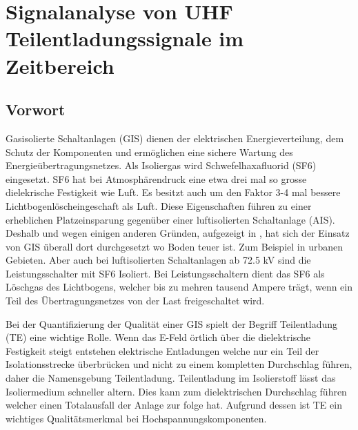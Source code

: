 %
%
%
\chapter{Signalanalyse von UHF Teilentladungssignale im Zeitbereich \label{chapter:gis}}
\begin{refsection}

\section{Vorwort}

Gasisolierte Schaltanlagen (GIS) dienen der elektrischen Energieverteilung, dem Schutz der Komponenten und ermöglichen eine sichere Wartung des Energieübertragungsnetzes.
Als Isoliergas wird Schwefelhaxafluorid (SF6) eingesetzt. SF6 hat bei Atmosphärendruck eine etwa drei mal so grosse dielekrische Festigkeit wie Luft. 
Es besitzt auch um den Faktor 3-4 mal bessere Lichtbogenlöscheingeschaft als Luft. 
Diese Eigenschaften führen zu einer erheblichen Platzeinsparung gegenüber einer luftisolierten Schaltanlage (AIS). \cite{buch:ABB}
Deshalb und wegen einigen anderen Gründen, aufgezeigt in \cite{buch:GIS/AIS}, hat sich der Einsatz von GIS überall dort durchgesetzt wo Boden teuer ist. Zum Beispiel in urbanen Gebieten. Aber auch bei luftisolierten Schaltanlagen ab 72.5 kV sind die Leistungsschalter mit SF6 Isoliert. 
Bei Leistungsschaltern dient das SF6 als Löschgas des Lichtbogens, welcher bis zu mehren tausend Ampere trägt, wenn ein Teil des Übertragungsnetzes von der Last freigeschaltet wird. \cite{buch:ABB} 

Bei der Quantifizierung der Qualität einer GIS spielt der Begriff Teilentladung (TE) eine wichtige Rolle. 
Wenn das E-Feld örtlich über die dielektrische Festigkeit steigt entstehen elektrische Entladungen welche nur ein Teil der Isolationsstrecke überbrücken und nicht zu einem kompletten Durchschlag führen, daher die Namensgebung Teilentladung. \cite{buch:Kuchler}
Teilentladung im Isolierstoff lässt das Isoliermedium  schneller altern. Dies kann zum dielektrischen Durchschlag führen welcher einen Totalausfall der Anlage zur folge hat.
Aufgrund dessen ist TE ein wichtiges Qualitätsmerkmal bei Hochspannungskomponenten. 


\end{refsection}
